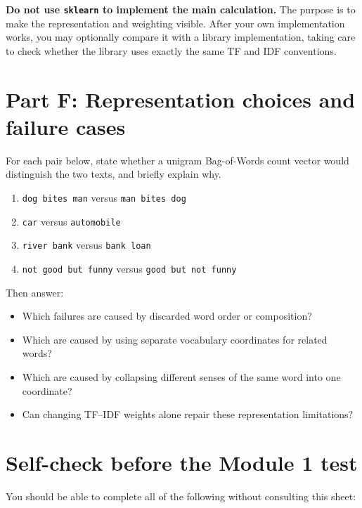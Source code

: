 \documentclass[11pt,a4paper]{article}
\begin{document}
\begin{checkbox}
\textbf{Do not use \texttt{sklearn} to implement the main calculation.} The purpose is to make the representation and weighting visible. After your own implementation works, you may optionally compare it with a library implementation, taking care to check whether the library uses exactly the same TF and IDF conventions.
\end{checkbox}

\section{Part F: Representation choices and failure cases}

For each pair below, state whether a unigram Bag-of-Words count vector would distinguish the two texts, and briefly explain why.

\begin{enumerate}
  \item \texttt{dog bites man} versus \texttt{man bites dog}
  \item \texttt{car} versus \texttt{automobile}
  \item \texttt{river bank} versus \texttt{bank loan}
  \item \texttt{not good but funny} versus \texttt{good but not funny}
\end{enumerate}

Then answer:

\begin{itemize}
  \item Which failures are caused by discarded word order or composition?
  \item Which are caused by using separate vocabulary coordinates for related words?
  \item Which are caused by collapsing different senses of the same word into one coordinate?
  \item Can changing TF--IDF weights alone repair these representation limitations?
\end{itemize}

\section{Self-check before the Module 1 test}

You should be able to complete all of the following without consulting this sheet:
\end{document}
